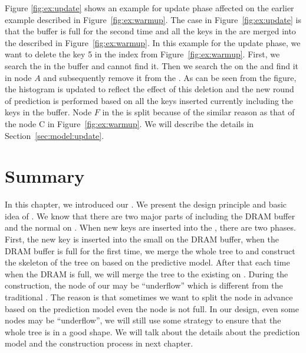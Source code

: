 Figure \ref{fig:ex:update} shows an example for update phase
affected on the earlier example described in Figure~\ref{fig:ex:warmup}.
The case in Figure~\ref{fig:ex:update} is that the buffer is
full for the second time and all the keys in the \bplustree are
merged into the \bptree described in Figure~\ref{fig:ex:warmup}.
In this example for the update phase,
we want to delete the key 5 in the \bptree index from Figure~\ref{fig:ex:warmup}.
First, we search the \bplustree in the buffer and cannot find it.
Then we search the \bptree on the
\pcm and find it in node $A$ and
subsequently remove it from the \bptree.
As can be seen from the figure,
the histogram is updated to reflect the effect of this deletion
and the new round of prediction is performed based on all the keys inserted
currently including the keys in the buffer.
Node $F$ in the \bptree is split because of the similar
reason as that of the node C in Figure~\ref{fig:ex:warmup}.
We will describe the details in Section~\ref{sec:model:update}.

\section{Summary}

In this chapter, we introduced our \bptree. We present the design principle and basic idea of \bptree. 
We know that there are two major parts of \bptree including the DRAM buffer and the normal \bplustree on \pcm. 
When new keys are inserted into the \bptree, there are two phases. First, the new key is inserted into 
the small \bplustree on the DRAM buffer, when the DRAM buffer is full for the first time, we merge the 
whole tree to \pcm and construct the skeleton of the tree on \pcm based on the predictive model. After 
that each time when the DRAM is full, we will merge the tree to the existing \bplustree on \pcm. 
During the construction, the node of our \bptree may be ``underflow'' which is different from the traditional
\bplustree. The reason is that sometimes we want to split the node in advance based on the prediction model even
the node is not full. In our design, even some nodes may be ``underflow'', we will still use some strategy to 
ensure that the whole tree is in a good shape. We will talk about the details about the prediction model 
and the construction process in next chapter. 

\newpage
